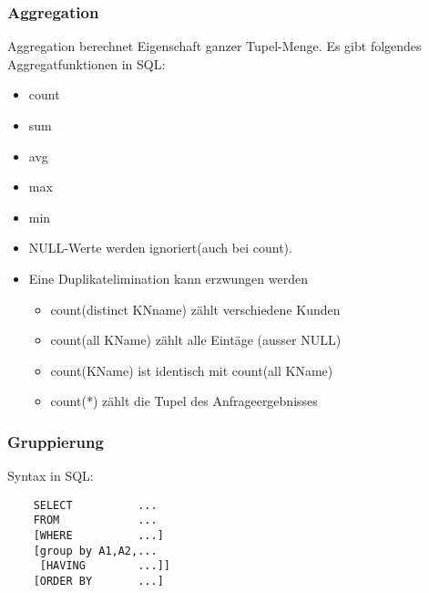 \subsubsection{Aggregation}
Aggregation berechnet Eigenschaft ganzer Tupel-Menge. Es gibt folgendes Aggregatfunktionen in SQL:\begin{itemize}
    \item count
    \item sum
    \item avg
    \item max
    \item min
\end{itemize}
\begin{remark}
    \begin{itemize}
        \item NULL-Werte werden ignoriert(auch bei count).
        \item Eine Duplikatelimination kann erzwungen werden\begin{itemize}
            \item count(distinct KNname) z\"ahlt verschiedene Kunden
            \item count(all KName) z\"ahlt alle Eint\"age (ausser NULL)
            \item count(KName) ist identisch mit count(all KName)
            \item count(*) z\"ahlt die Tupel des Anfrageergebnisses
        \end{itemize}
    \end{itemize}
\end{remark}
\subsubsection{Gruppierung}
Syntax in SQL:
\begin{verbatim}
    SELECT          ...
    FROM            ...
    [WHERE          ...] 
    [group by A1,A2,...
     [HAVING        ...]]
    [ORDER BY       ...] 
\end{verbatim}
